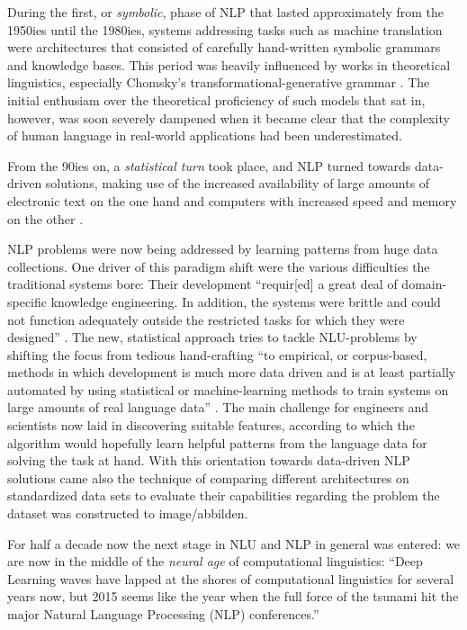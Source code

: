 
During the first, or \emph{symbolic}, phase of NLP that lasted approximately from the 1950ies
until the 1980ies, systems addressing tasks such as machine translation were architectures that
consisted of carefully hand-written symbolic grammars and knowledge bases. This period was heavily
influenced by works in theoretical linguistics, especially Chomsky's transformational-generative
grammar \citep{chomsky2009syntactic,chomsky2014aspects}. The initial enthusiam over the theoretical
proficiency of such models that sat in, however, was soon severely dampened when it became clear
that the complexity of human language in real-world applications had been underestimated.


From the 90ies on, a \emph{statistical turn} took place, and NLP turned
towards data-driven solutions, making use of the increased availability of large
amounts of electronic text on the one hand and computers with increased speed and
memory on the other \citep{liddy2001natural}.

NLP problems were now being addressed by learning patterns from huge data collections. One driver
of this paradigm shift were the various difficulties the traditional systems bore: Their
development ``requir[ed] a great deal of domain-specific knowledge engineering. In addition,
the systems were brittle and could not function adequately outside the restricted tasks for
which they were designed'' \citep[p.~13]{brill1997overview}. The new, statistical {\color{red}
approach} tries to tackle NLU-problems by shifting the focus from tedious hand-crafting ``to
empirical, or corpus-based, methods in which development is much more data driven and is at
least partially automated by using statistical or machine-learning methods to train systems
on large amounts of real language data'' \citep[p.~13]{brill1997overview}. The main challenge
for engineers and scientists now laid in discovering suitable features, according to which the
algorithm would hopefully learn helpful patterns from the language data for solving the task
at hand. With this orientation towards data-driven NLP solutions came also the {\color{red} technique} of
comparing different architectures on standardized data sets to evaluate their capabilities regarding
the problem the dataset was constructed to {\color{red} image/abbilden}.

For half a decade now the next stage in NLU and NLP in general was entered: we are now in the
middle of the \emph{neural age} of computational linguistics:
{\color{red} ``Deep Learning waves have lapped at the shores of computational linguistics for several
years now, but 2015 seems like the year when the full force of the tsunami hit the
major Natural Language Processing (NLP) conferences.'' \citep[p.~701]{manning2015computational}}

